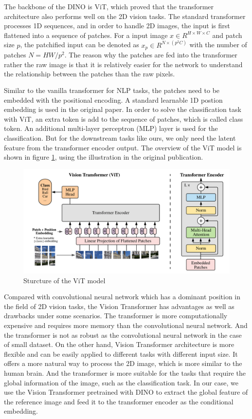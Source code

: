 \documentclass[12pt,DIV14,BCOR12mm,a4paper,footinclude=false,headinclude,parskip=half-,twoside,openright,cleardoublepage=empty,toc=index,bibliography=totoc,listof=totoc]{scrreprt}
\numberwithin{equation}{chapter}
\begin{document}
The backbone of the DINO is ViT\cite{dosovitskiy2021image}, which proved that the transformer architecture also performs well on the 2D vision tasks. The standard transformer processes 1D sequences, and in order to handle 2D images, the input is first flattened into a sequence of patches. For a input image $x\in R^{H\times W\times C}$ and patch size $p$, the patchified input can be denoted as $x_p\in R^{N\times(p^{2}C)}$ with the number of patches $N=HW/{p^{2}}$. The reason why the patches are fed into the transformer rather the raw image is that it is relatively easier for the network to understand the relationship between the patches than the raw pixels.

Similar to the vanilla transformer for NLP tasks, the patches need to be embedded with the positional encoding. A standard learnable 1D postion embedding is used in the original paper. In order to solve the classification task with ViT, an extra token is add to the sequence of patches, which is called class token. An additional multi-layer perceptron (MLP) layer is used for the classification. But for the downstream tasks like ours, we only need the latent feature from the transformer encoder output. The overview of the ViT model is shown in figure \ref{img:vit}, using the illustration in the original publication.
\begin{figure}[h]
	\centering
	\includegraphics[scale=.23]{img/vit.png}
	\caption{Sturcture of the ViT model}
	\label{img:vit}
\end{figure}

Compared with convolutional neural network which has a dominant position in the field of 2D vision tasks, the Vision Transformer has advantages as well as drawbacks under some scenarios. The transformer is more computationally expensive and requires more memory than the convolutional neural network. And the transformer is not as robust as the convolutional neural network in the case of small dataset. On the other hand, Vision Transformer architecture is more flexible and can be easily applied to different tasks with different input size. It offers a more natural way to process the 2D image, which is more similar to the human brain. And the transformer is more suitable for the tasks that require the global information of the image, such as the classification task. In our case, we use the Vision Transformer pretrained with DINO to extract the global feature of the reference image and feed it to the transformer encoder as the conditional embedding.
\end{document}
